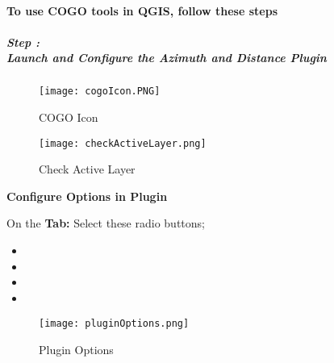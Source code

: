 \clearpage
\paragraph{To use COGO tools in QGIS, follow these steps}
\vspace{.2in}


\subparagraph*{{\LARGE Step \thestepCount:}\\Launch and Configure the Azimuth and Distance Plugin}


\begin{figure}[H]
\centering
     \texttt{[image: cogoIcon.PNG]}
\vspace{-.2in}

\caption{COGO Icon}
\end{figure}
\vspace{-.2in}

\vspace{.3in}


\begin{figure}[H] %
\centering
    \texttt{[image: checkActiveLayer.png]}
\vspace{-.3in}

\caption{Check Active Layer}
\end{figure}
\clearpage
\noindent\textbf{Configure Options in Plugin}
\vspace{.2in}

\large On the \textbf{ Tab:} Select these radio buttons;
\begin{itemize}
\item {}
\item {}
\item {}
\item {}
\end{itemize}
\begin{figure}[H]
\centering
    \texttt{[image: pluginOptions.png]}
\vspace{-.2in}

\caption{Plugin Options}
\end{figure}
\clearpage

